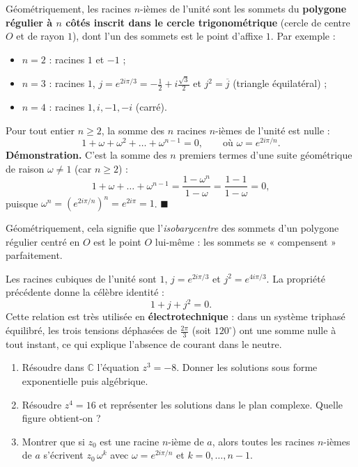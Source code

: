 \documentclass[11pt]{article}
\begin{document}
Géométriquement, les racines $n$-ièmes de l'unité sont les sommets du \textbf{polygone régulier à $n$ côtés inscrit dans le cercle trigonométrique} (cercle de centre $O$ et de rayon $1$), dont l'un des sommets est le point d'affixe $1$. Par exemple :
\begin{itemize}
\item $n = 2$ : racines $1$ et $-1$ ;
\item $n = 3$ : racines $1$, $j = e^{2i\pi/3} = -\frac{1}{2} + i\frac{\sqrt{3}}{2}$ et $j^2 = \overline{j}$ (triangle équilatéral) ;
\item $n = 4$ : racines $1, i, -1, -i$ (carré).
\end{itemize}

\begin{propriete}
Pour tout entier $n \geq 2$, la somme des $n$ racines $n$-ièmes de l'unité est nulle :
\[ 1 + \omega + \omega^2 + \dots + \omega^{n-1} = 0, \qquad \text{où } \omega = e^{2i\pi/n}. \]
\textbf{Démonstration.} C'est la somme des $n$ premiers termes d'une suite géométrique de raison $\omega \neq 1$ (car $n \geq 2$) :
\[ 1 + \omega + \dots + \omega^{n-1} = \frac{1 - \omega^n}{1 - \omega} = \frac{1 - 1}{1 - \omega} = 0, \]
puisque $\omega^n = \left(e^{2i\pi/n}\right)^n = e^{2i\pi} = 1$. $\blacksquare$

Géométriquement, cela signifie que l'\emph{isobarycentre} des sommets d'un polygone régulier centré en $O$ est le point $O$ lui-même : les sommets se « compensent » parfaitement.
\end{propriete}

\begin{exemplebox}
Les racines cubiques de l'unité sont $1$, $j = e^{2i\pi/3}$ et $j^2 = e^{4i\pi/3}$. La propriété précédente donne la célèbre identité :
\[ 1 + j + j^2 = 0. \]
Cette relation est très utilisée en \textbf{électrotechnique} : dans un système triphasé équilibré, les trois tensions déphasées de $\frac{2\pi}{3}$ (soit $120^\circ$) ont une somme nulle à tout instant, ce qui explique l'absence de courant dans le neutre.
\end{exemplebox}

\begin{exercice}
\begin{enumerate}
\item Résoudre dans $\mathbb{C}$ l'équation $z^3 = -8$. Donner les solutions sous forme exponentielle puis algébrique.
\item Résoudre $z^4 = 16$ et représenter les solutions dans le plan complexe. Quelle figure obtient-on ?
\item Montrer que si $z_0$ est une racine $n$-ième de $a$, alors toutes les racines $n$-ièmes de $a$ s'écrivent $z_0 \, \omega^k$ avec $\omega = e^{2i\pi/n}$ et $k = 0, \dots, n-1$.
\end{enumerate}
\end{exercice}
\end{document}
